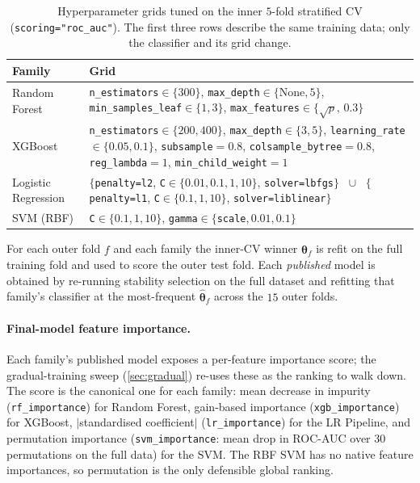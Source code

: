 \documentclass[11pt,a4paper]{article}
\providecommand{\Cref}[1]{\autoref{#1}}
\begin{document}
\begin{table}[h]
\centering
\caption{Hyperparameter grids tuned on the inner $5$-fold stratified CV
(\texttt{scoring="roc\_auc"}). The first three rows describe the same
training data; only the classifier and its grid change.}
\label{tab:grids}
\small
\begin{tabular}{p{3.4cm}p{10.4cm}}
\toprule
Family & Grid \\
\midrule
Random Forest &
\texttt{n\_estimators}$\in\{300\}$,
\texttt{max\_depth}$\in\{\text{None},5\}$,
\texttt{min\_samples\_leaf}$\in\{1,3\}$,
\texttt{max\_features}$\in\{\sqrt{p},\,0.3\}$ \\[2pt]
XGBoost &
\texttt{n\_estimators}$\in\{200,400\}$,
\texttt{max\_depth}$\in\{3,5\}$,
\texttt{learning\_rate}$\in\{0.05,0.1\}$,
\texttt{subsample}$=0.8$,
\texttt{colsample\_bytree}$=0.8$,
\texttt{reg\_lambda}$=1$,
\texttt{min\_child\_weight}$=1$ \\[2pt]
Logistic Regression &
$\{$\texttt{penalty=l2}, \texttt{C}$\in\{0.01,0.1,1,10\}$, \texttt{solver=lbfgs}$\}$
$\;\cup\;$
$\{$\texttt{penalty=l1}, \texttt{C}$\in\{0.1,1,10\}$, \texttt{solver=liblinear}$\}$ \\[2pt]
SVM (RBF) &
\texttt{C}$\in\{0.1,1,10\}$,
\texttt{gamma}$\in\{$\texttt{scale}$,0.01,0.1\}$ \\
\bottomrule
\end{tabular}
\end{table}

For each outer fold $f$ and each family the inner-CV winner
$\widehat{\bm{\theta}}_f$ is refit on the full training fold and used to
score the outer test fold. Each \emph{published} model is obtained by
re-running stability selection on the full dataset and refitting that
family's classifier at the most-frequent $\widehat{\bm{\theta}}_f$
across the $15$ outer folds.

\paragraph{Final-model feature importance.}
Each family's published model exposes a per-feature importance score; the
gradual-training sweep (\Cref{sec:gradual}) re-uses these as the ranking
to walk down. The score is the canonical one for each family:
mean decrease in impurity (\texttt{rf\_importance}) for Random Forest,
gain-based importance (\texttt{xgb\_importance}) for XGBoost,
$|$standardised coefficient$|$ (\texttt{lr\_importance}) for the LR
Pipeline, and permutation importance (\texttt{svm\_importance}: mean drop
in ROC-AUC over $30$ permutations on the full data) for the SVM. The RBF
SVM has no native feature importances, so permutation is the only
defensible global ranking.
\end{document}
